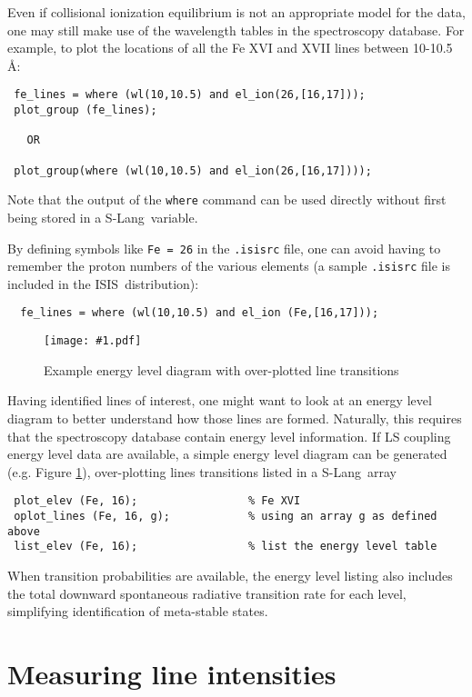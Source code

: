 \documentclass{book}
\newcommand{\putfig}[1]{\texttt{[image: \#1.pdf]}}
\newcommand{\putfig}[1]{\psfig{file=#1.ps}}
\newcommand{\isisx}{{\sc ISIS~}}
\newcommand{\slang}{{\sc S-Lang}}
\begin{document}
Even if collisional ionization equilibrium is not an appropriate model for
the data, one may still make use of the wavelength tables in the
spectroscopy database.  For example, to plot the locations of all the Fe XVI
and XVII lines between 10-10.5 \AA:
 \begin{verbatim}
 fe_lines = where (wl(10,10.5) and el_ion(26,[16,17]));
 plot_group (fe_lines);

   OR

 plot_group(where (wl(10,10.5) and el_ion(26,[16,17])));
 \end{verbatim}
Note that the output of the {\tt where} command can be used directly without
first being stored in a \slang\ variable.

By defining symbols like {\tt Fe = 26} in the {\tt .isisrc} file, one can
avoid having to remember the proton numbers of the various elements (a
sample {\tt .isisrc} file is included in the \isisx distribution):
 \begin{verbatim}
  fe_lines = where (wl(10,10.5) and el_ion (Fe,[16,17]));
 \end{verbatim}

\begin{figure}[ht]
\putfig{figures/elev}
\caption{Example energy level diagram with over-plotted line transitions}
\label{fig:elev}
\end{figure}

Having identified lines of interest, one might want to look at an energy
level diagram to better understand how those lines are formed. Naturally,
this requires that the spectroscopy database contain energy level
information. If LS coupling energy level data are available, a simple energy
level diagram can be generated (e.g. Figure \ref{fig:elev}), over-plotting
lines transitions listed in a \slang\ array
 \begin{verbatim}
 plot_elev (Fe, 16);                 % Fe XVI
 oplot_lines (Fe, 16, g);            % using an array g as defined above
 list_elev (Fe, 16);                 % list the energy level table
 \end{verbatim}
When transition probabilities are available, the energy level listing also
includes the total downward spontaneous radiative transition rate for each
level, simplifying identification of meta-stable states.

\section{Measuring line intensities}
\end{document}
